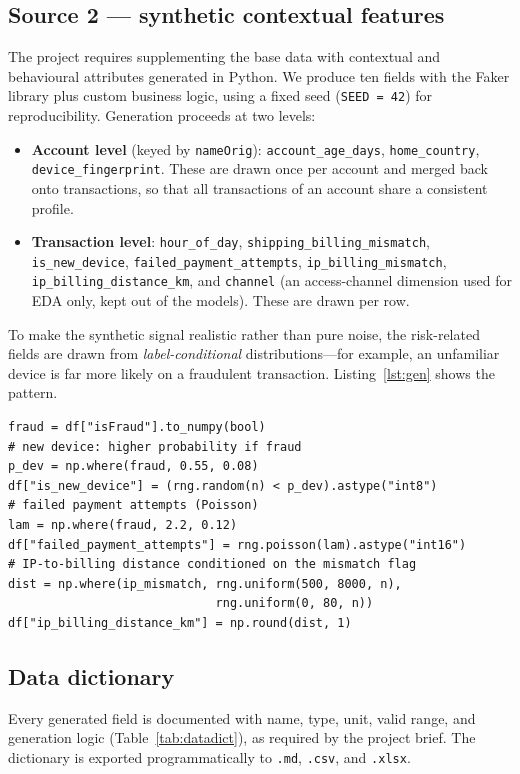 \documentclass{article}
\begin{document}
\subsection{Source 2 --- synthetic contextual features}
The project requires supplementing the base data with contextual and
behavioural attributes generated in Python. We produce ten fields with
the Faker library plus custom business logic, using a fixed seed
(\texttt{SEED = 42}) for reproducibility. Generation proceeds at two
levels:

\begin{itemize}
    \item \textbf{Account level} (keyed by \texttt{nameOrig}):
    \texttt{account\_age\_days}, \texttt{home\_country},
    \texttt{device\_fingerprint}. These are drawn once per account and
    merged back onto transactions, so that all transactions of an
    account share a consistent profile.
    \item \textbf{Transaction level}: \texttt{hour\_of\_day},
    \texttt{shipping\_billing\_mismatch}, \texttt{is\_new\_device},
    \texttt{failed\_payment\_attempts}, \texttt{ip\_billing\_mismatch},
    \texttt{ip\_billing\_distance\_km}, and \texttt{channel} (an
    access-channel dimension used for EDA only, kept out of the models).
    These are drawn per row.
\end{itemize}

To make the synthetic signal realistic rather than pure noise, the
risk-related fields are drawn from \emph{label-conditional}
distributions---for example, an unfamiliar device is far more likely on
a fraudulent transaction. Listing~\ref{lst:gen} shows the pattern.

\begin{lstlisting}[style=pythonstyle, caption={Generating
transaction-level features conditioned on the label (excerpt).},
label={lst:gen}]
fraud = df["isFraud"].to_numpy(bool)
# new device: higher probability if fraud
p_dev = np.where(fraud, 0.55, 0.08)
df["is_new_device"] = (rng.random(n) < p_dev).astype("int8")
# failed payment attempts (Poisson)
lam = np.where(fraud, 2.2, 0.12)
df["failed_payment_attempts"] = rng.poisson(lam).astype("int16")
# IP-to-billing distance conditioned on the mismatch flag
dist = np.where(ip_mismatch, rng.uniform(500, 8000, n),
                             rng.uniform(0, 80, n))
df["ip_billing_distance_km"] = np.round(dist, 1)
\end{lstlisting}

\subsection{Data dictionary}
Every generated field is documented with name, type, unit, valid range,
and generation logic (Table~\ref{tab:datadict}), as required by the
project brief. The dictionary is exported programmatically to
\texttt{.md}, \texttt{.csv}, and \texttt{.xlsx}.
\end{document}
